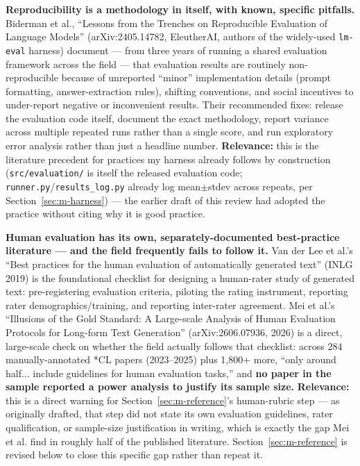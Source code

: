\textbf{Reproducibility is a methodology in itself, with known, specific pitfalls.} Biderman et al., \textquotedblleft{}Lessons from the Trenches on Reproducible Evaluation of Language Models\textquotedblright{} (arXiv:2405.14782, EleutherAI, authors of the widely-used \texttt{lm-eval} harness) document — from three years of running a shared evaluation framework across the field — that evaluation results are routinely non-reproducible because of unreported \textquotedblleft{}minor\textquotedblright{} implementation details (prompt formatting, answer-extraction rules), shifting conventions, and social incentives to under-report negative or inconvenient results. Their recommended fixes: release the evaluation code itself, document the exact methodology, report variance across multiple repeated runs rather than a single score, and run exploratory error analysis rather than just a headline number. \textbf{Relevance:} this is the literature precedent for practices my harness already follows by construction (\texttt{src/evaluation/} is itself the released evaluation code; \texttt{runner.py}/\texttt{results\_log.py} already log mean$\pm$stdev across repeats, per Section~\ref{sec:m-harness}) — the earlier draft of this review had adopted the practice without citing why it is good practice.



\textbf{Human evaluation has its own, separately-documented best-practice literature — and the field frequently fails to follow it.} Van der Lee et al.'s \textquotedblleft{}Best practices for the human evaluation of automatically generated text\textquotedblright{} (INLG 2019) is the foundational checklist for designing a human-rater study of generated text: pre-registering evaluation criteria, piloting the rating instrument, reporting rater demographics/training, and reporting inter-rater agreement. Mei et al.'s \textquotedblleft{}Illusions of the Gold Standard: A Large-scale Analysis of Human Evaluation Protocols for Long-form Text Generation\textquotedblright{} (arXiv:2606.07936, 2026) is a direct, large-scale check on whether the field actually follows that checklist: across 284 manually-annotated *CL papers (2023–2025) plus 1,800+ more, \textquotedblleft{}only around half... include guidelines for human evaluation tasks,\textquotedblright{} and \textbf{no paper in the sample reported a power analysis to justify its sample size.} \textbf{Relevance:} this is a direct warning for Section~\ref{sec:m-reference}'s human-rubric step — as originally drafted, that step did not state its own evaluation guidelines, rater qualification, or sample-size justification in writing, which is exactly the gap Mei et al. find in roughly half of the published literature. Section~\ref{sec:m-reference} is revised below to close this specific gap rather than repeat it.



